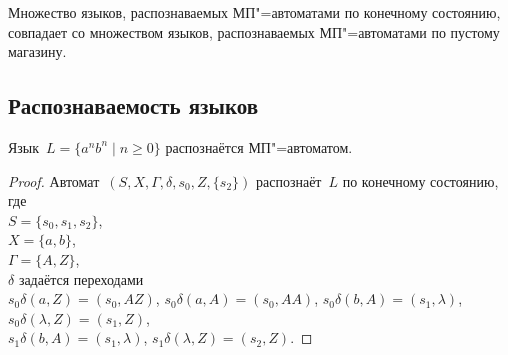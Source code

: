 \begin{statement}
Множество языков, распознаваемых МП"=автоматами по конечному состоянию, совпадает со множеством языков, распознаваемых МП"=автоматами по пустому магазину.
\end{statement}

\subsection{Распознаваемость языков}
\begin{statement}
Язык~$L = \{ a^n b^n \mid n \geqslant 0 \}$ распознаётся МП"=автоматом.
\end{statement}
\begin{proof}
Автомат~$(S, X, \Gamma, \delta, s_0, Z, \{ s_2 \})$ распознаёт~$L$ по конечному состоянию, где\\
$S = \{ s_0, s_1, s_2 \}$,\\
$X = \{ a, b \}$,\\
$\Gamma = \{ A, Z \}$,\\
$\delta$ задаётся переходами\\
$s_0 \delta(a, Z) = (s_0, AZ)$,
$s_0 \delta(a, A) = (s_0, AA)$,
$s_0 \delta(b, A) = (s_1, \lambda)$,
$s_0 \delta(\lambda, Z) = (s_1, Z)$,\\
$s_1 \delta(b, A) = (s_1, \lambda)$,
$s_1 \delta(\lambda, Z) = (s_2, Z)$.
\end{proof}
